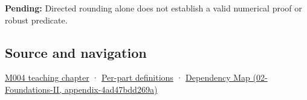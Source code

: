 \textbf{Pending:} Directed rounding alone does not establish a valid numerical proof or robust predicate.

\subsection{Source and navigation}\label{source-and-navigation}

\href{Continuous\%20Notes/Computing\%20Foundations\%20-\%20From\%20Bits\%20to\%20C++\%20and\%20Systems\%20APIs\#A\%20stretching\%20ruler\%20for\%20real-valued\%20quantities}{M004 teaching chapter} · \hyperref[appendix-fd090d982a15]{Per-part definitions} · \href{}{Dependency Map (02-Foundations-II, appendix-4ad47bdd269a)}
